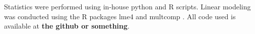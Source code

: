 \documentclass[12pt]{article}
\begin{document}
Statistics were performed using in-house python and R scripts. Linear modeling was conducted using the R packages lme4 \citep{Bates2012} and
multcomp \citep{Hothorn2008}. All code used is available at \textbf{the github or something}.



\end{document}
